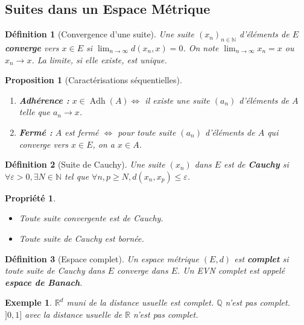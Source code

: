 \documentclass[a4paper]{article}
\newcommand{\N}{\mathbb{N}}
\newcommand{\R}{\mathbb{R}}
\newcommand{\Q}{\mathbb{Q}}
\newtheorem{definition}{Définition}[section]
\newtheorem{exemple}{Exemple}[section]
\newtheorem{proposition}{Proposition}[section]
\newtheorem{propriete}{Propriété}[section] %
\begin{document}
\subsection{Suites dans un Espace Métrique}
\begin{definition}[Convergence d'une suite]
    Une suite \((x_n)_{n \in \N}\) d'éléments de \(E\) \textbf{converge} vers \(x \in E\) si \(\lim_{n \to \infty} d(x_n, x) = 0\).
    On note \(\lim_{n \to \infty} x_n = x\) ou \(x_n \to x\). La limite, si elle existe, est unique.
\end{definition}
\begin{proposition}[Caractérisations séquentielles]
   \begin{enumerate}
       \item \textbf{Adhérence :} \(x \in \operatorname{Adh}(A) \iff\) il existe une suite \((a_n)\) d'éléments de \(A\) telle que \(a_n \to x\).
       \item \textbf{Fermé :} \(A\) est fermé \(\iff\) pour toute suite \((a_n)\) d'éléments de \(A\) qui converge vers \(x \in E\), on a \(x \in A\).
   \end{enumerate}
\end{proposition}
\begin{definition}[Suite de Cauchy]
    Une suite \((x_n)\) dans \(E\) est de \textbf{Cauchy} si \(\forall \varepsilon > 0, \exists N \in \N\) tel que \(\forall n, p \ge N, d(x_n, x_p) \le \varepsilon\).
\end{definition}
\begin{propriete}
    \begin{itemize}
        \item Toute suite convergente est de Cauchy.
        \item Toute suite de Cauchy est bornée.
    \end{itemize}
\end{propriete}
\begin{definition}[Espace complet]
    Un espace métrique \((E,d)\) est \textbf{complet} si toute suite de Cauchy dans \(E\) converge dans \(E\).
    Un EVN complet est appelé \textbf{espace de Banach}.
\end{definition}
\begin{exemple}
    \(\R^d\) muni de la distance usuelle est complet. \(\Q\) n'est pas complet. \(]0,1]\) avec la distance usuelle de \(\R\) n'est pas complet.
\end{exemple}
\end{document}
